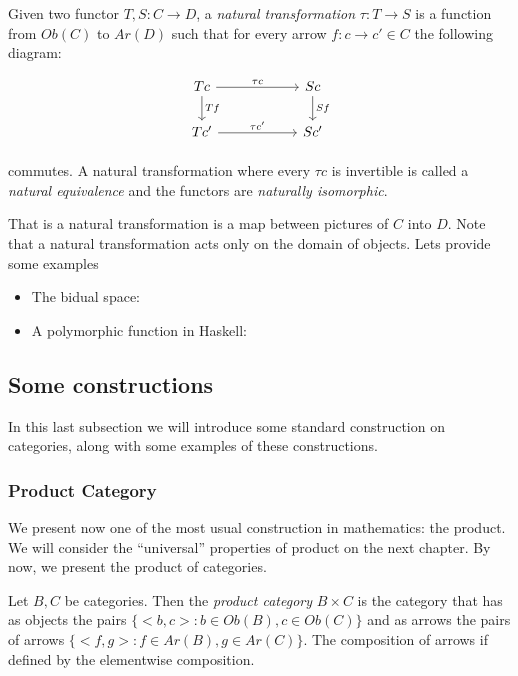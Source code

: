 \begin{definition}
  Given two functor $T,S:C\to D$, a \emph{natural transformation} $\tau : T \to S$ is a function from $Ob(C)$ to $Ar(D)$ such that for every arrow $f:c \to c' \in C$ the following diagram:
\[
  \begin{tikzpicture}
  \node {\begin{tikzcd}[column sep=20mm]
      Tc\ar[r,"\tau c"]\ar[d,"Tf"] & Sc\ar[d,"Sf"]\\
      Tc'\ar[r,"\tau c'"] & Sc'
  \end{tikzcd}};
\end{tikzpicture}
\]

commutes. A natural transformation where every $\tau c$ is invertible is called a \emph{natural equivalence} and the functors are \emph{naturally isomorphic}.
  \end{definition}


  That is a natural transformation is a map between pictures of $C$ into $D$. Note that a natural transformation acts only on the domain of objects. Lets provide some examples

  \begin{example}
    \begin{itemize}
    \item The bidual space:
    \item A polymorphic function in Haskell:
    \end{itemize}
  \end{example}

  
\subsection{Some constructions}
In this last subsection we will introduce some standard construction on categories, along with some examples of these constructions.


\subsubsection{Product Category}
We present now one of the most usual construction in mathematics: the product. We will consider the ``universal'' properties of product on the next chapter. By now, we present the product of categories.

\begin{definition}
  Let $B,C$ be categories. Then the \emph{product category} $B\times C$ is the category that has as objects the pairs $\{<b,c>: b \in Ob(B), c\in Ob(C)\}$ and as arrows the pairs of arrows $\{<f,g>: f \in Ar(B), g\in Ar(C)\}$. The composition of arrows if defined by the elementwise composition. 
\end{definition}

